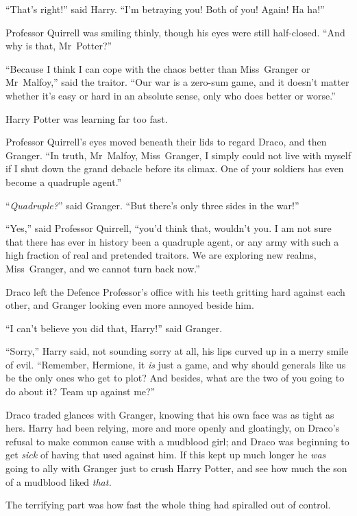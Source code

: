 “That’s right!” said Harry. “I’m betraying you! Both of you! Again! Ha ha!”

Professor Quirrell was smiling thinly, though his eyes were still half-closed. “And why is that, Mr~Potter?”

“Because I think I can cope with the chaos better than Miss~Granger or Mr~Malfoy,” said the traitor. “Our war is a zero-sum game, and it doesn’t matter whether it’s easy or hard in an absolute sense, only who does better or worse.”

Harry Potter was learning far too fast.

Professor Quirrell’s eyes moved beneath their lids to regard Draco, and then Granger. “In truth, Mr~Malfoy, Miss~Granger, I simply could not live with myself if I shut down the grand debacle before its climax. One of your soldiers has even become a quadruple agent.”

“\emph{Quadruple?}” said Granger. “But there’s only three sides in the war!”

“Yes,” said Professor Quirrell, “you’d think that, wouldn’t you. I am not sure that there has ever in history been a quadruple agent, or any army with such a high fraction of real and pretended traitors. We are exploring new realms, Miss~Granger, and we cannot turn back now.”

Draco left the Defence Professor’s office with his teeth gritting hard against each other, and Granger looking even more annoyed beside him.

“I can’t believe you did that, Harry!” said Granger.

“Sorry,” Harry said, not sounding sorry at all, his lips curved up in a merry smile of evil. “Remember, Hermione, it \emph{is} just a game, and why should generals like us be the only ones who get to plot? And besides, what are the two of you going to do about it? Team up against me?”

Draco traded glances with Granger, knowing that his own face was as tight as hers. Harry had been relying, more and more openly and gloatingly, on Draco’s refusal to make common cause with a mudblood girl; and Draco was beginning to get \emph{sick} of having that used against him. If this kept up much longer he \emph{was} going to ally with Granger just to crush Harry Potter, and see how much the son of a mudblood liked \emph{that.}

\later

The terrifying part was how fast the whole thing had spiralled out of control.


